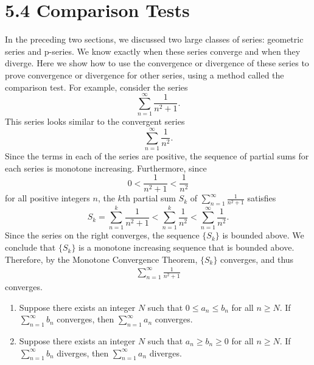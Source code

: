 \documentclass{report}
\begin{document}
    \pagebreak 
    \section*{5.4 Comparison Tests}
    \bigbreak \noindent 
    In the preceding two sections, we discussed two large classes of series: geometric series and p-series. We know exactly when these series converge and when they diverge. Here we show how to use the convergence or divergence of these series to prove convergence or divergence for other series, using a method called the comparison test.
    For example, consider the series
    \[
    \sum_{n=1}^{\infty} \frac{1}{n^2+1}.
    \]
    This series looks similar to the convergent series
    \[
    \sum_{n=1}^{\infty} \frac{1}{n^2}.
    \]
    Since the terms in each of the series are positive, the sequence of partial sums for each series is monotone increasing. Furthermore, since
    \[
    0 < \frac{1}{n^2+1} < \frac{1}{n^2}
    \]
    for all positive integers \( n \), the \( k \)th partial sum \( S_k \) of \( \sum_{n=1}^{\infty} \frac{1}{n^2+1} \) satisfies
    \[
    S_k = \sum_{n=1}^{k} \frac{1}{n^2+1} < \sum_{n=1}^{k} \frac{1}{n^2} < \sum_{n=1}^{\infty} \frac{1}{n^2}.
    \]
    \bigbreak \noindent 
    Since the series on the right converges, the sequence \(\{S_k\}\) is bounded above. We conclude that \(\{S_k\}\) is a monotone increasing sequence that is bounded above. Therefore, by the Monotone Convergence Theorem, \(\{S_k\}\) converges, and thus
    \begin{align}
    \sum_{n=1}^{\infty} \frac{1}{n^2+1}
    \end{align}
    converges.

    \bigbreak \noindent 
    \begin{thrm}
        \begin{enumerate}
            \item Suppose there exists an integer \( N \) such that \( 0 \leq a_n \leq b_n \) for all \( n \geq N \). If \( \sum_{n=1}^{\infty} b_n \) converges, then \( \sum_{n=1}^{\infty} a_n \) converges. 
            \item  Suppose there exists an integer \( N \) such that \( a_n \geq b_n \geq 0 \) for all \( n \geq N \). If \( \sum_{n=1}^{\infty} b_n \) diverges, then \( \sum_{n=1}^{\infty} a_n \) diverges.
        \end{enumerate}
    \end{thrm}
    \bigbreak \noindent 
    
\end{document}
